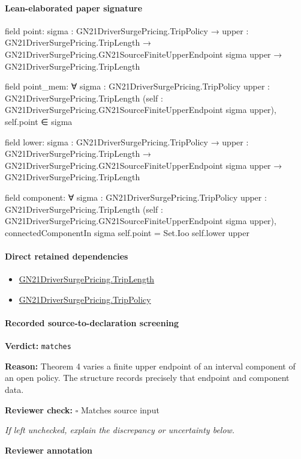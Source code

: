 \documentclass[10pt]{article}
\newcommand{\reviewerbox}{%
  \par\noindent\fbox{\parbox{0.96\linewidth}{\rule{0pt}{0.38in}}}\par
}
\newcommand{\reviewmatch}[1]{%
  \par\noindent\textbf{Reviewer check:} $\square$\; #1\par
  \noindent\emph{If left unchecked, explain the discrepancy or uncertainty below.}\par
}
\begin{document}
\paragraph{Lean-elaborated paper signature}
\begin{ReviewVerbatim}
field point:
{sigma : GN21DriverSurgePricing.TripPolicy} →
  {upper : GN21DriverSurgePricing.TripLength} →
    GN21DriverSurgePricing.GN21SourceFiniteUpperEndpoint sigma upper → GN21DriverSurgePricing.TripLength

field point_mem:
∀ {sigma : GN21DriverSurgePricing.TripPolicy} {upper : GN21DriverSurgePricing.TripLength}
  (self : GN21DriverSurgePricing.GN21SourceFiniteUpperEndpoint sigma upper), self.point ∈ sigma

field lower:
{sigma : GN21DriverSurgePricing.TripPolicy} →
  {upper : GN21DriverSurgePricing.TripLength} →
    GN21DriverSurgePricing.GN21SourceFiniteUpperEndpoint sigma upper → GN21DriverSurgePricing.TripLength

field component:
∀ {sigma : GN21DriverSurgePricing.TripPolicy} {upper : GN21DriverSurgePricing.TripLength}
  (self : GN21DriverSurgePricing.GN21SourceFiniteUpperEndpoint sigma upper),
  connectedComponentIn sigma self.point = Set.Ioo self.lower upper
\end{ReviewVerbatim}

\paragraph{Direct retained dependencies}
\begin{itemize}\raggedright
\item \hyperlink{governing-declaration-a616c143f22cf2bc}{GN21\allowbreak{}Driver\allowbreak{}Surge\allowbreak{}Pricing.\allowbreak{}Trip\allowbreak{}Length}
\item \hyperlink{governing-declaration-4312ad4cb899871f}{GN21\allowbreak{}Driver\allowbreak{}Surge\allowbreak{}Pricing.\allowbreak{}Trip\allowbreak{}Policy}
\end{itemize}
\paragraph{Recorded source-to-declaration screening}
\textbf{Verdict:} \texttt{matches}
\\
{\raggedright
\textbf{Reason:} Theorem 4 varies a finite upper endpoint of an interval component of an open policy.\allowbreak{} The structure records precisely that endpoint and component data.\allowbreak{}
\par}
\reviewmatch{Matches source input}
\noindent\textbf{Reviewer annotation}\par
\reviewerbox
\clearpage
\hypertarget{paper-prerequisite-bdf8218f91905191}{}
\end{document}
